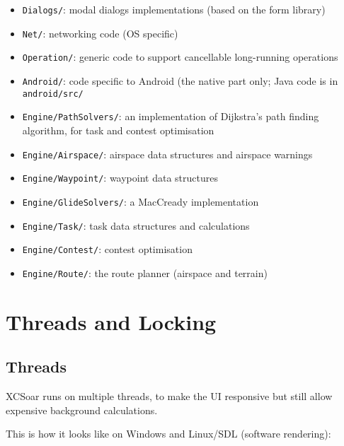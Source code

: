 \documentclass[a4paper,12pt]{refrep}
\begin{document}
\begin{itemize}
\item \texttt{Dialogs/}: modal dialogs implementations (based on the
  form library)

\item \texttt{Net/}: networking code (OS specific)

\item \texttt{Operation/}: generic code to support cancellable
  long-running operations

\item \texttt{Android/}: code specific to Android (the native part
  only; Java code is in \texttt{android/src/}

\item \texttt{Engine/PathSolvers/}: an implementation of Dijkstra's
  path finding algorithm, for task and contest optimisation

\item \texttt{Engine/Airspace/}: airspace data structures and airspace
  warnings

\item \texttt{Engine/Waypoint/}: waypoint data structures

\item \texttt{Engine/GlideSolvers/}: a MacCready implementation

\item \texttt{Engine/Task/}: task data structures and calculations

\item \texttt{Engine/Contest/}: contest optimisation

\item \texttt{Engine/Route/}: the route planner (airspace and terrain)

\end{itemize}

\section{Threads and Locking}

\subsection{Threads}

XCSoar runs on multiple threads, to make the UI responsive but still
allow expensive background calculations.

This is how it looks like on Windows and Linux/SDL (software
rendering):
\end{document}
